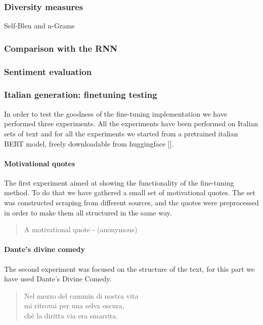 \documentclass[10pt,twocolumn,letterpaper]{article}
\begin{document}
\subsubsection{Diversity measures}
Self-Bleu and n-Grams
\subsubsection{Comparison with the RNN}
\subsubsection{Sentiment evaluation}


\subsubsection{Italian generation: finetuning testing}
In order to test the goodness of the fine-tuning implementation we have performed three experiments.
All the experiments have been performed on Italian sets of text and for all the experiments we started from a pretrained
italian BERT model, freely downloadable from huggingface [].

\paragraph{Motivational quotes} The first experiment aimed at showing the functionality of the fine-tuning method.
To do that we have gathered a small set of motivational quotes.
The set was constructed scraping from different sources, and the quotes were preprocessed in order to make them
all structured in the same way.
\begin{quote}
   A motivational quote - (anonymous)
\end{quote}

\paragraph{Dante's divine comedy} The second experiment was focused on the structure of the text, for this part we have used Dante's Divine Comedy.

\begin{quote}
   Nel mezzo del cammin di nostra vita\\
   mi ritrovai per una selva oscura,\\
   ché la diritta via era smarrita.\\

\end{quote}
\end{document}
